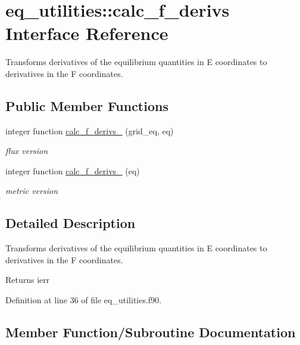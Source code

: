 \hypertarget{interfaceeq__utilities_1_1calc__f__derivs}{}\section{eq\+\_\+utilities\+:\+:calc\+\_\+f\+\_\+derivs Interface Reference}
\label{interfaceeq__utilities_1_1calc__f__derivs}


Transforms derivatives of the equilibrium quantities in E coordinates to derivatives in the F coordinates.  


\subsection*{Public Member Functions}
\begin{DoxyCompactItemize}
\item 
integer function \hyperlink{interfaceeq__utilities_1_1calc__f__derivs_a22e3ecb3617be8bb8012694b6a28848e}{calc\+\_\+f\+\_\+derivs\+\_} (grid\+\_\+eq, eq)
\begin{DoxyCompactList}\small\item\em flux version \end{DoxyCompactList}\item 
integer function \hyperlink{interfaceeq__utilities_1_1calc__f__derivs_a95c9a588dab233aef66c5c9abd22dbdf}{calc\+\_\+f\+\_\+derivs\+\_} (eq)
\begin{DoxyCompactList}\small\item\em metric version \end{DoxyCompactList}\end{DoxyCompactItemize}


\subsection{Detailed Description}
Transforms derivatives of the equilibrium quantities in E coordinates to derivatives in the F coordinates. 

\begin{DoxyReturn}{Returns}
ierr 
\end{DoxyReturn}


Definition at line 36 of file eq\+\_\+utilities.\+f90.



\subsection{Member Function/\+Subroutine Documentation}
\mbox{\label{interfaceeq__utilities_1_1calc__f__derivs_a22e3ecb3617be8bb8012694b6a28848e}} 
